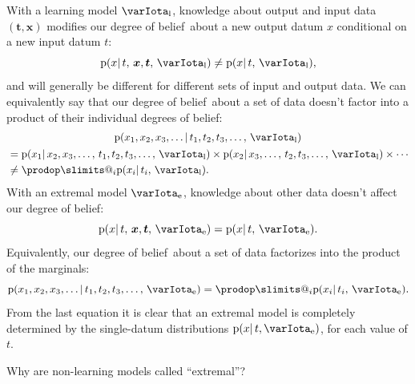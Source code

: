 \documentclass[\ifafour a4paper,12pt,\else a5paper,10pt,\fi%
onecolumn,oneside,article,%
british%
]{memoir}
\makeatletter
\theoremstyle{remark}
\theoremstyle{innote}
\def\prod{\DOTSI\prodop\slimits@}
\newcommand*{\pf}{\mathrm{p}}%
\renewcommand*{\|}{\mathpunct{|}}
\newcommand*{\dob}{degree of belief}
\newcommand*{\dobs}{degrees of belief}
\newcommand*{\yI}{\varIota}
\newcommand*{\yIl}{\yI_{\textrm{l}}}
\newcommand*{\yIe}{\yI_{\textrm{e}}}
\newcommand*{\yt}{\bm{t}}
\newcommand*{\yx}{\bm{x}}
\makeatother
\begin{document}
With a learning model $\yIl$, knowledge about output and input data
$(\yt, \yx)$ modifies our \dob\ about a new output datum $x$ conditional on
a new input datum $t$:
\begin{equation}
  \label{eq:learning_model}
  \pf(x \| t,\, \yx, \yt, \, \yIl) \ne
  \pf(x \| t,\, \yIl),
\end{equation}
and will generally be different for different sets of input and output
data. We can equivalently say that our \dob\ about a set of data doesn't
factor into a product of their individual \dobs:
\begin{multline}
  \label{eq:learning_model_dependent}
  \pf(x_1, x_2, x_3, \dotsc \| t_1, t_2, t_3, \dotsc,\, \yIl)\\
  \!\begin{aligned}[b]
  &=\pf(x_1 \| x_2, x_3, \dotsc,\,  t_1, t_2, t_3, \dotsc,\, \yIl) \times
  \pf(x_2 \| x_3, \dotsc,\,  t_2, t_3, \dotsc,\, \yIl) \times
    \dotsb
    \\
      &\ne %
     \prod_i   \pf(x_i \| t_i,\, \yIl).
  \end{aligned}
\end{multline}
With an extremal model $\yIe$, knowledge about other data doesn't affect
our \dob:
\begin{equation}
  \label{eq:extremal_model}
  \pf(x \| t,\, \yx, \yt, \, \yIe) =
  \pf(x \| t,\, \yIe).
\end{equation}
Equivalently, our \dob\ about a set of data factorizes into the product of
the marginals:
\begin{equation}
  \label{eq:extremal_model_independent}
  \pf(x_1, x_2, x_3, \dotsc \| t_1, t_2, t_3, \dotsc,\, \yIe)
  = %
  \prod_i   \pf(x_i \| t_i,\, \yIe).
\end{equation}
From the last equation it is clear that an extremal model is completely
determined by the single-datum distributions $\pf(x \| t, \yIe)$, for each
value of $t$.

\bigskip

Why are non-learning models called \enquote{extremal}?
\end{document}
